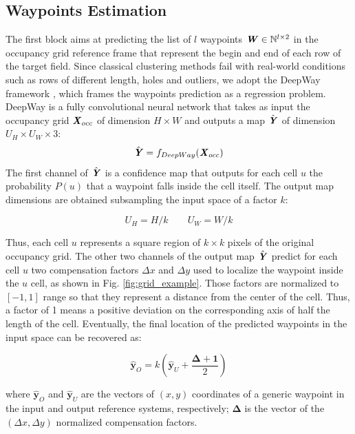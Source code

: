 \documentclass[journal]{IEEEtran}
\begin{document}
\subsection{Waypoints Estimation}
The first block aims at predicting the list of $l$ waypoints ${\textbf{\emph{W}} \in \mathbb{N}^{l\times 2}}$ in the occupancy grid reference frame that represent the begin and end of each row of the target field. Since classical clustering methods fail with real-world conditions such as rows of different length, holes and outliers, we adopt the DeepWay framework \cite{mazzia2021deepway}, which frames the waypoints prediction as a regression problem. DeepWay is a fully convolutional neural network that takes as input the occupancy grid  $\textbf{\textit{X}}_{occ}$ of dimension $H \times W $ and outputs a map $\hat{\textbf{\textit{Y}}}$ of dimension $U_H \times U_W \times 3$:
\begin{equation}
    \hat{\textbf{\textit{Y}}} = f_{DeepWay}(\textbf{\emph{X}}_{occ})
    \label{eq:deepway}
\end{equation}
The first channel of $\hat{\textbf{\textit{Y}}}$ is a confidence map that outputs for each cell $u$ the probability $P(u)$ that a waypoint falls inside the cell itself. The output map dimensions are obtained subsampling the input space of a factor $k$:

\begin{equation}
    U_H = H/k \qquad U_W = W/k
\end{equation}

Thus, each cell $u$ represents a square region of $k \times k$ pixels of the original occupancy grid. The other two channels of the output map $\hat{\textbf{\textit{Y}}}$ predict for each cell $u$ two compensation factors $\Delta x$ and $\Delta y$ used to localize the waypoint inside the $u$ cell, as shown in Fig. \ref{fig:grid_example}. Those factors are normalized to $[-1,1]$ range so that they represent a distance from the center of the cell. Thus, a factor of 1 means a positive deviation on the corresponding axis of half the length of the cell. Eventually, the final location of the predicted waypoints in the input space can be recovered as:

\begin{equation}
    \hat{\mathbf{y}}_{O}=k\left(\hat{\mathbf{y}}_{U} + \frac{\mathbf{\Delta + 1}}{2}\right)
    \label{eq:wp_coor}
\end{equation}

where $\hat{\mathbf{y}}_{O}$ and $\hat{\mathbf{y}}_{U}$ are the vectors of $(x,y)$ coordinates of a generic waypoint in the input and output reference systems, respectively; $\mathbf{\Delta}$ is the vector of the $(\Delta x,\Delta y)$ normalized compensation factors.
\end{document}
